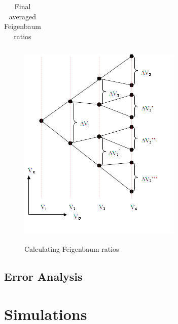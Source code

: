 \documentclass[12pt]{report}
\begin{document}

	
	\begin{table}
		\centering
		\begin{tabular}{|c|c|c|c|c|}
			\hline
			 
		\end{tabular}
		\label{tab:fegeinbaum}
		\caption{Final averaged Feigenbaum ratios}
	\end{table}
	
	\begin{figure}
		\centering
		\includegraphics{Pics/Bifurcation Diagram.png}
		\label{fig: Calculating Feigenbaum ratios}
		\caption{Calculating Feigenbaum ratios}
	\end{figure}
	



\section{Error Analysis} %
\label{sec:Error Analysis}



\chapter{Simulations} %
\label{ch:Simulations}
\end{document}
